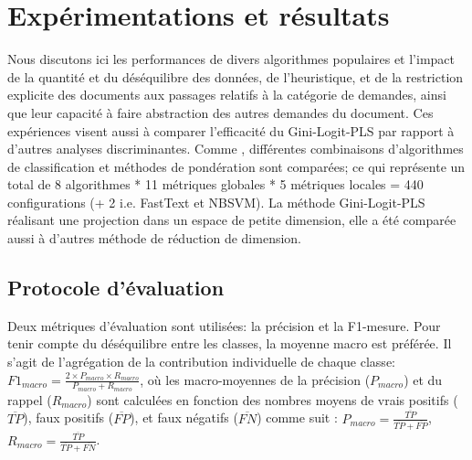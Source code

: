 
\section{Expérimentations et résultats}
\label{sec:sensresultat:experimentations}
Nous discutons ici les performances de divers algorithmes populaires et l'impact de la quantité et du déséquilibre des données, de l'heuristique, et de la restriction explicite des documents aux passages relatifs à la catégorie de demandes, ainsi que leur capacité à faire abstraction des autres demandes du document. {Ces expériences visent aussi à comparer l'efficacité du Gini-Logit-PLS par rapport à d'autres analyses discriminantes}.  Comme \citet{im2017textclasstermweighting}, différentes combinaisons d'algorithmes de classification et méthodes de pondération  sont comparées; ce qui représente un total de 8 algorithmes * 11 métriques globales * 5 métriques locales = 440 configurations (+ 2 i.e. FastText et NBSVM). La méthode Gini-Logit-PLS réalisant une projection dans un espace de petite dimension, elle a été comparée aussi à d'autres méthode de réduction de dimension.

\subsection{Protocole d'évaluation}
Deux métriques d'évaluation sont utilisées: la précision et la F1-mesure. Pour tenir compte du déséquilibre entre les classes, la moyenne macro est préférée. Il s'agit de l'agrégation de la contribution individuelle de chaque classe: $F1_{macro} = \frac{2 \times P_{macro} \times R_{macro}}{P_{macro} + R_{macro}}$, où les macro-moyennes de la précision ($P_{macro}$) et du rappel ($R_{macro}$) sont calculées en fonction des nombres moyens de vrais positifs ($\overline{TP}$), faux positifs ($\overline{FP}$), et faux négatifs ($\overline{FN}$) comme suit \citep{van2013macromicroeval}:
$P_{macro} = \frac{\overline{TP}}{\overline{TP} + \overline{FP}}$, $R_{macro} = \frac{\overline{TP}}{\overline{TP} + \overline{FN}}$.


